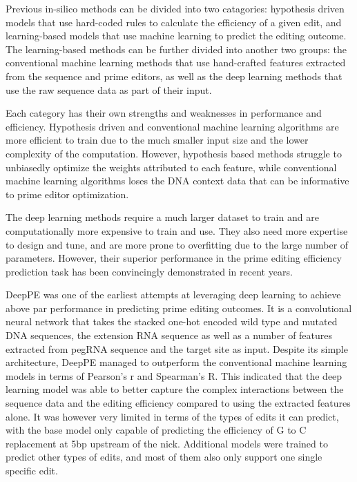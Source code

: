Previous in-silico methods can be divided into two catagories: hypothesis driven models that use hard-coded rules to calculate the efficiency of a given edit\cite{hsuPrimeDesignSoftwareRapid2021,hwangPEDesignerPEAnalyzerWebbased2021}, and learning-based models that use machine learning to predict the editing outcome. 
The learning-based methods can be further divided into another two groups: the conventional machine learning methods that use hand-crafted features extracted from the sequence and prime editors\cite{liEasyPrimeMachineLearning2021,koeppelPredictionPrimeEditing2023}, as well as the deep learning methods that use the raw sequence data as part of their input\cite{yuPredictionEfficienciesDiverse2023,kimPredictingEfficiencyPrime2021, mathisPredictingPrimeEditing2023}. 

Each category has their own strengths and weaknesses in performance and efficiency. Hypothesis driven and conventional machine learning algorithms are more efficient to train due to the much smaller input size and the lower complexity of the computation. However, hypothesis based methods struggle to unbiasedly optimize the weights attributed to each feature\cite{liEasyPrimeMachineLearning2021}, while conventional machine learning algorithms loses the DNA context data that can be informative to prime editor optimization. 

The deep learning methods require a much larger dataset to train and are computationally more expensive to train and use. They also need more expertise to design and tune, and are more prone to overfitting due to the large number of parameters. However, their superior performance in the prime editing efficiency prediction task has been convincingly demonstrated in recent years.


DeepPE was one of the earliest attempts at leveraging deep learning to achieve above par performance in predicting prime editing outcomes\cite{kimPredictingEfficiencyPrime2021}. It is a convolutional neural network that takes the stacked one-hot encoded wild type and  mutated DNA sequences, the extension RNA sequence as well as a number of features extracted from pegRNA sequence and the target site as input. Despite its simple architecture, DeepPE managed to outperform the conventional machine learning models in terms of Pearson's r and Spearman's R. This indicated that the deep learning model was able to better capture the complex interactions between the sequence data and the editing efficiency compared to using the extracted features alone. It was however very limited in terms of the types of edits it can predict, with the base model only capable of predicting the efficiency of G to C replacement at 5bp upstream of the nick. Additional models were trained to predict other types of edits, and most of them also only support one single specific edit.

